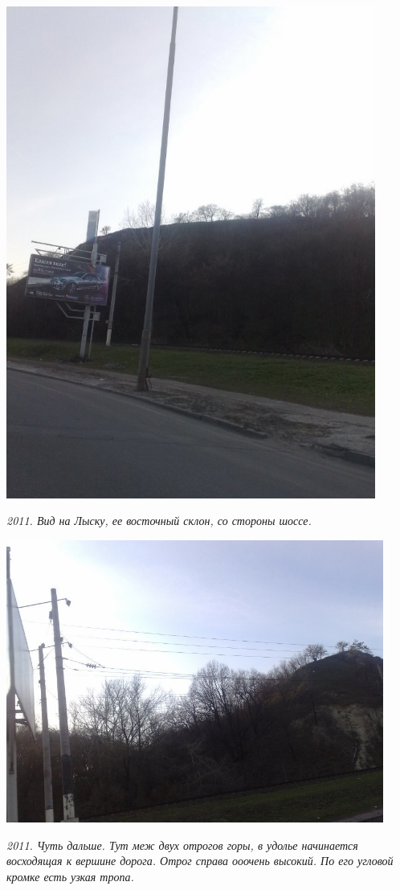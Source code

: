\begin{center}
\includegraphics[width=0.91\textwidth]{chast-lys-gory/zazver/devich-gora-01.jpg}

\textit{2011. Вид на Лыску, ее восточный склон, со стороны шоссе.}
\end{center}

\newpage

\begin{center}
\includegraphics[width=0.93\textwidth]{chast-lys-gory/zazver/devich-gora-02.jpg}

\textit{2011. Чуть дальше. Тут меж двух отрогов горы, в удолье начинается восходящая к вершине дорога. Отрог справа ооочень высокий. По его угловой кромке есть узкая тропа.}
\end{center}

